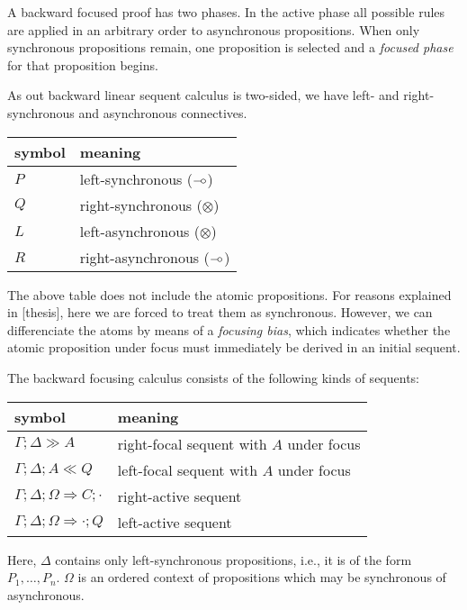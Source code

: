 \documentclass{article}
\theoremstyle{definition}
\def\limp {\mathbin{{-}\mkern-3.5mu{\circ}}}
\begin{document}
A backward focused proof has two phases. In the active phase all possible rules
are applied in an arbitrary order to asynchronous propositions. When only
synchronous propositions remain, one proposition is selected and a \emph{focused
  phase} for that proposition begins.

As out backward linear sequent calculus is two-sided, we have left- and right-
synchronous and asynchronous connectives.

\begin{table}[h]
  \centering
  \begin{tabular}{|l|l|}
    \hline
    \textbf{symbol} & \textbf{meaning} \\
    \hline
    $P$ & left-synchronous ($\limp$) \\
    $Q$ & right-synchronous ($\otimes$) \\
    $L$ & left-asynchronous ($\otimes$) \\
    $R$ & right-asynchronous ($\limp$) \\
    \hline
  \end{tabular}
\end{table}

The above table does not include the atomic propositions. For reasons explained
in [thesis], here we are forced to treat them as synchronous. However, we can
differenciate the atoms by means of a \emph{focusing bias}, which indicates
whether the atomic proposition under focus must immediately be derived in an
initial sequent.

The backward focusing calculus consists of the following kinds of sequents:

\begin{table}[h]
  \centering
  \begin{tabular}{|l|l|}
    \hline
    \textbf{symbol} & \textbf{meaning} \\
    \hline
    $\Gamma; \Delta \gg A$ & right-focal sequent with $A$ under focus \\
    $\Gamma; \Delta; A \ll Q$ & left-focal sequent with $A$ under focus \\
    $\Gamma; \Delta; \Omega \Longrightarrow C; \cdot$ & right-active sequent \\
    $\Gamma; \Delta; \Omega \Longrightarrow \cdot; Q$ & left-active sequent \\
    \hline
  \end{tabular}
\end{table}

Here, $\Delta$ contains only left-synchronous propositions, i.e., it is of the
form $P_1, \dots, P_n$. $\Omega$ is an ordered context of propositions which may
be synchronous of asynchronous.
\end{document}
